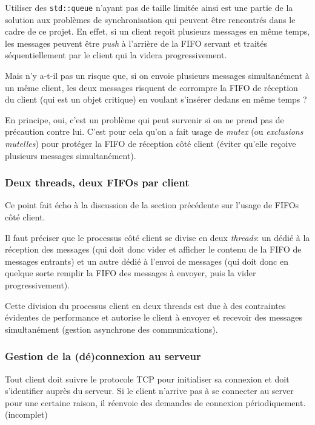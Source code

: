 \documentclass{article}
\begin{document}
\noindent Utiliser des \texttt{std::queue} n'ayant pas de taille limitée ainsi est une partie de la solution aux problèmes de synchronisation qui peuvent être rencontrés dans le cadre de ce projet. En effet, si un client reçoit plusieurs messages en même temps, les messages peuvent être \textit{push} à l'arrière de la FIFO servant et traités séquentiellement par le client qui la videra progressivement.


 \noindent Mais n'y a-t-il pas un risque que, si on envoie plusieurs messages simultanément à un même client, les deux messages risquent de corrompre la FIFO de réception du client (qui est un objet critique) en voulant s'insérer dedans en même temps ?


\noindent En principe, oui, c'est un problème qui peut survenir si on ne prend pas de précaution contre lui. C'est pour cela qu'on a fait usage de \textit{mutex} (ou \textit{exclusions mutelles}) \cite{std::mutex} pour protéger la FIFO de réception côté client (éviter qu'elle reçoive plusieurs messages simultanément).


\subsubsection{Deux threads, deux FIFOs par client}
\noindent Ce point fait écho à la discussion de la section précédente sur l'usage de FIFOs côté client.

\noindent Il faut préciser que le processus côté client se divise en deux \textit{threads}: un dédié à la réception des messages (qui doit donc vider et afficher le contenu de la FIFO de messages entrants) et un autre dédié à l'envoi de messages (qui doit donc en quelque sorte remplir la FIFO des messages à envoyer, puis la vider progressivement).

\noindent Cette division du processus client en deux threads est due à des contraintes évidentes de performance et autorise le client à envoyer et recevoir des messages simultanément (gestion asynchrone des communications).

\subsubsection{Gestion de la (dé)connexion au serveur}
\noindent Tout client doit suivre le protocole TCP \cite{TCP-IP} pour initialiser sa connexion et doit s'identifier auprès du serveur. Si le client n'arrive pas à se connecter au server pour une certaine raison, il réenvoie des demandes de connexion périodiquement.
(incomplet)
\end{document}
